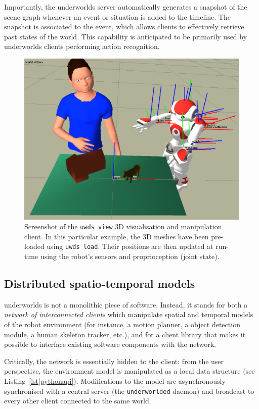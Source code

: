 \documentclass[conference]{IEEEtran}
\newcommand{\uwds}{{\sc underworlds}\xspace}
\begin{document}
Importantly, the \uwds server automatically generates a snapshot of
the scene graph whenever an event or situation is added to the timeline. The
snapshot is associated to the event, which allows clients to effectively retrieve past
states of the world. This capability is anticipated to be primarily used by \uwds clients
performing action recognition.

\begin{figure}
    \centering
    \includegraphics[width=\linewidth]{uwds-screenshot}
    \caption{Screenshot of the {\tt uwds view} 3D visualisation and manipulation
    client. In this particular example, the 3D meshes have been pre-loaded using
    {\tt uwds load}. Their positions are then updated at run-time using the
    robot's sensors and proprioception (joint state).}
    \label{fig|uwds-view}
\end{figure}

\subsection{Distributed spatio-temporal models}
\label{arch}

\uwds is not a monolithic piece of software. Instead, it stands for both a
\emph{network of interconnected clients} which manipulate spatial and temporal
models of the robot environment (for instance, a motion planner, a object
detection module, a human skeleton tracker, etc.), and for a {client library}
that makes it possible to interface existing software components with the network.

Critically, the network is essentially hidden to the client: from the user
perspective, the environment model is manipulated as a local data structure (see
Listing~\ref{lst|pythonapi}). Modifications to the model are asynchronously synchronised with
a central server (the {\tt underworlded} daemon) and broadcast to every other
client connected to the same world.
\end{document}
